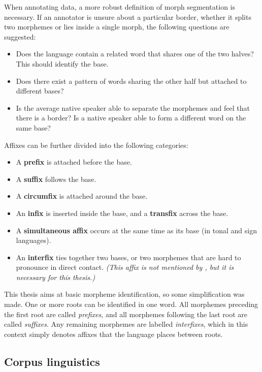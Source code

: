When annotating data, a more robust definition of morph segmentation is necessary. If an annotator is unsure about a particular border, whether it splits two morphemes or lies inside a single morph, the following questions are suggested:
\begin{itemize}
    \item Does the language contain a related word that shares one of the two halves? This should identify the base.
    \item Does there exist a pattern of words sharing the other half but attached to different bases?
    \item Is the average native speaker able to separate the morphemes and feel that there is a border? Is a native speaker able to form a different word on the same base?
\end{itemize}


\newpage


Affixes can be further divided into the following categories:
\begin{itemize}
    \item A \textbf{prefix} is attached before the base.
    \item A \textbf{suffix} follows the base.
    \item A \textbf{circumfix} is attached around the base.
    \item An \textbf{infix} is inserted inside the base, and a \textbf{transfix} across the base.
    \item A \textbf{simultaneous affix} occurs at the same time as its base (in tonal and sign languages).
    \item An \textbf{interfix} ties together two bases, or two morphemes that are hard to pronounce in direct contact. \textit{(This affix is not mentioned by \textcite{AndersonEtAl2022}, but it is necessary for this thesis.)}
\end{itemize}

This thesis aims at basic morpheme identification, so some simplification was made. One or more roots can be identified in one word. All morphemes preceding the first root are called \textit{prefixes}, and all morphemes following the last root are called \textit{suffixes}. Any remaining morphemes are labelled \textit{interfixes}, which in this context simply denotes affixes that the language places between roots.

\newpage

\subsection{Corpus linguistics}

